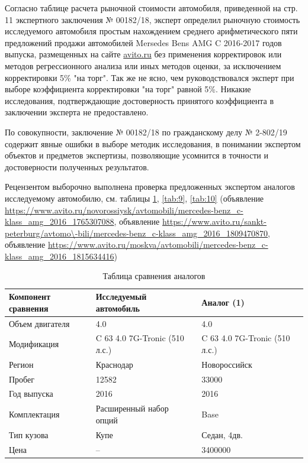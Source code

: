   
  
Согласно таблице расчета рыночной стоимости автомобиля, приведенной на стр. 11 экспертного заключения № 00182/18, эксперт определил рыночную стоимость исследуемого автомобиля простым нахождением среднего арифметического пяти предложений продажи автомобилей   Mersedes Bens AMG C  2016-2017 годов выпуска, размещенных на сайте \url {avito.ru} без применения  корректировок  или методов  регрессионного анализа или иных методов оценки, за исключением корректировки 5\% "на торг". Так же не ясно, чем руководствовался эксперт при выборе коэффициента корректировки "на торг" равной 5\%. Никакие исследования, подтверждающие достоверность принятого коэффициента в заключении эксперта не предоставлено. 
  
  
   
\par По совокупности, заключение № 00182/18 по гражданскому делу № 2-802/19  содержит явные  ошибки в выборе методик исследования, в понимании экспертом объектов и предметов экспертизы, позволяющие  усомнится в точности и достоверности полученных результатов. 
  
  
\par Рецензентом выборочно выполнена проверка предложенных экспертом аналогов исследуемому автомобилю, см. таблицы \ref{tab:8}, \ref{tab:9}, \ref{tab:10} (объявление \url{https://www.avito.ru/novorossiysk/avtomobili/mercedes-benz_c-klass_amg_2016_1765307088}, объявление \url {https://www.avito.ru/sankt-peterburg/avtomo\-bili/mercedes-benz_c-klass_amg_2016_1809470870}, объявление \url {https://www.avito.ru/moskva/avtomobili/mercedes-benz_c-klass_amg_2016_1815634416})  
 
 
\begin{longtable}{|p{5cm}|p{5cm}|p{5cm}|}
	\caption[]{\footnotesize {Таблица сравнения аналогов}} \label{tab:8}\\ 
	\hline
	\rowcolor[HTML]{EFEFEF} 
	
	Компонент сравнения & Исследуемый автомобиль& Аналог (1)  \\ \hline \endhead %
	Объем двигателя  &4.0 & 4.0 \\ \hline
	Модификация  &C 63 4.0 7G-Tronic (510 л.с.)  & C 63 4.0 7G-Tronic (510 л.с.) \\ \hline
	Регион  & Краснодар  & Новороссийск\\ \hline
	\rowcolor[HTML]{ FAEBD7} 
	Пробег & 12582   & 33000\\ \hline
	Год выпуска  & 2016  & 2016 \\ \hline
	\rowcolor[HTML]{ FAEBD7} 
	Комплектация  & Расширенный набор опций  & Base \\ \hline
	\rowcolor[HTML]{ FAEBD7} 
	Тип кузова  & Купе  & Седан, 4дв. \\ \hline
	Цена  & --  & 3400000 \\ \hline
\end{longtable}

